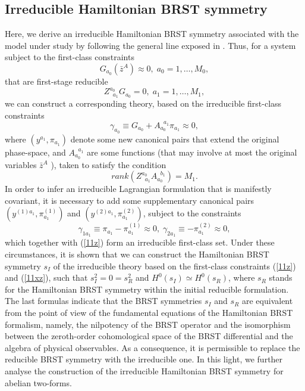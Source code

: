 \documentclass[a4paper,12pt]{article}
\begin{document}
\subsection{Irreducible Hamiltonian BRST symmetry}

Here, we derive an irreducible Hamiltonian BRST symmetry associated with the
model under study by following the general line exposed in \cite{24}. Thus,
for a system subject to the first-class constraints 
\begin{equation}
G_{a_{0}}\left( \bar{z}^{A}\right) \approx 0,\;a_{0}=1,\ldots ,M_{0},
\label{11x}
\end{equation}
that are first-stage reducible 
\begin{equation}
Z_{\;\;a_{1}}^{a_{0}}G_{a_{0}}=0,\;a_{1}=1,\ldots ,M_{1},  \label{11y}
\end{equation}
we can construct a corresponding theory, based on the irreducible
first-class constraints 
\begin{equation}
\gamma _{a_{0}}\equiv G_{a_{0}}+A_{a_{0}}^{\;\;a_{1}}\pi _{a_{1}}\approx 0,
\label{11z}
\end{equation}
where $\left( y^{a_{1}},\pi _{a_{1}}\right) $ denote some new canonical
pairs that extend the original phase-space, and $A_{a_{0}}^{\;\;a_{1}}$ are
some functions (that may involve at most the original variables $\bar{z}^{A}$%
), taken to satisfy the condition 
\begin{equation}
rank\left( Z_{\;\;a_{1}}^{a_{0}}A_{a_{0}}^{\;\;b_{1}}\right) =M_{1}.
\label{11xy}
\end{equation}
In order to infer an irreducible Lagrangian formulation that is manifestly
covariant, it is necessary to add some supplementary canonical pairs $\left(
y^{\left( 1\right) a_{1}},\pi _{a_{1}}^{\left( 1\right) }\right) $ and $%
\left( y^{\left( 2\right) a_{1}},\pi _{a_{1}}^{\left( 2\right) }\right) $,
subject to the constraints 
\begin{equation}
\gamma _{1a_{1}}\equiv \pi _{a_{1}}-\pi _{a_{1}}^{\left( 1\right) }\approx
0,\;\gamma _{2a_{1}}\equiv -\pi _{a_{1}}^{\left( 2\right) }\approx 0,
\label{11xz}
\end{equation}
which together with (\ref{11z}) form an irreducible first-class set. Under
these circumstances, it is shown \cite{24} that we can construct the
Hamiltonian BRST symmetry $s_{I}$ of the irreducible theory based on the
first-class constraints (\ref{11z}) and (\ref{11xz}), such that $%
s_{I}^{2}=0=s_{R}^{2}$ and $H^{0}\left( s_{I}\right) \simeq H^{0}\left(
s_{R}\right) $, where $s_{R}$ stands for the Hamiltonian BRST symmetry
within the initial reducible formulation. The last formulas indicate that
the BRST symmetries $s_{I}$ and $s_{R}$ are equivalent from the point of
view of the fundamental equations of the Hamiltonian BRST formalism, namely,
the nilpotency of the BRST operator and the isomorphism between the
zeroth-order cohomological space of the BRST differential and the algebra of
physical observables. As a consequence, it is permissible to replace the
reducible BRST symmetry with the irreducible one. In this light, we further
analyse the construction of the irreducible Hamiltonian BRST symmetry for
abelian two-forms.
\end{document}
